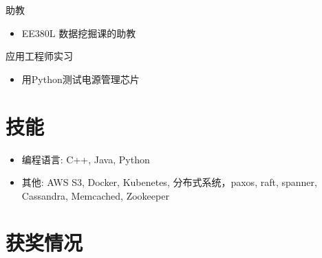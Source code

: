 \documentclass{resume}
\begin{document}
助教
\begin{itemize}
  \item EE380L 数据挖掘课的助教 
\end{itemize}

应用工程师实习
\begin{itemize}
  \item 用Python测试电源管理芯片
\end{itemize}



\section{技能}
\begin{itemize}[parsep=0.5ex]
  \item 编程语言:  C++, Java, Python
  \item 其他: AWS S3, Docker, Kubenetes, 分布式系统，paxos, raft, spanner, Cassandra, Memcached, Zookeeper
\end{itemize}

\section{获奖情况}

%
%
\end{document}
